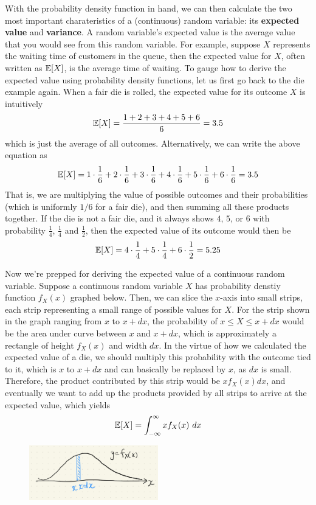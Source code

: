 With the probability density function in hand, we can then calculate the two most important charateristics of a (continuous) random variable: its \textbf{expected value} and \textbf{variance}.  A random variable's expected value is the average value that you would see from this random variable.  For example, suppose $X$ represents the waiting time of customers in the queue, then the expected value for $X$, often written as $\mathbb{E}[X]$, is the average time of waiting.  To gauge how to derive the expected value using probability density functions, let us first go back to the die example again.  When a fair die is rolled, the expected value for its outcome $X$ is intuitively
\[\mathbb{E}[X] = \frac{1+2+3+4+5+6}{6} = 3.5\] 
which is just the average of all outcomes.  Alternatively, we can write the above equation as
\[\mathbb{E}[X] = 1 \cdot \frac{1}{6} + 2 \cdot \frac{1}{6} + 3 \cdot \frac{1}{6} + 4 \cdot \frac{1}{6} + 5 \cdot \frac{1}{6} + 6 \cdot \frac{1}{6} = 3.5\]
That is, we are multiplying the value of possible outcomes and their probabilities (which is uniformly $1/6$ for a fair die), and then summing all these products together.  If the die is not a fair die, and it always shows $4$, $5$, or $6$ with probability $\frac{1}{4}$, $\frac{1}{4}$ and $\frac{1}{2}$, then the expected value of its outcome would then be
\[\mathbb{E}[X] = 4 \cdot \frac{1}{4} + 5 \cdot \frac{1}{4} + 6 \cdot \frac{1}{2} = 5.25\]

Now we're prepped for deriving the expected value of a continuous random variable.  Suppose a continuous random variable $X$ has probability denstiy function $f_X(x)$ graphed below.  Then, we can slice the $x$-axis into small strips, each strip representing a small range of possible values for $X$.  For the strip shown in the graph ranging from $x$ to $x+dx$, the probability of $x \le X \le x+dx$ would be the area under curve between $x$ and $x+dx$, which is approximately a rectangle of height $f_X(x)$ and width $dx$.  In the virtue of how we calculated the expected value of a die, we should multiply this probability with the outcome tied to it, which is $x$ to $x + dx$ and can basically be replaced by $x$, as $dx$ is small.  Therefore, the product contributed by this strip would be $x f_X(x) dx$, and eventually we want to add up the products provided by all strips to arrive at the expected value, which yields
\[\mathbb{E}[X] = \int_{-\infty}^{\infty} x f_X(x)~dx\]

\begin{figure}[ht]
    \centering
    \includegraphics[width = 0.5\textwidth]{figures/chap 07/expectation.png}
\end{figure}

